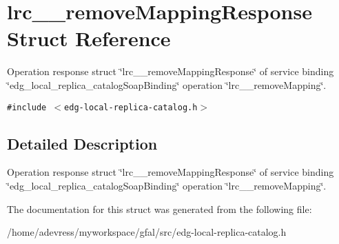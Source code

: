 \section{lrc\_\-\_\-remove\-Mapping\-Response Struct Reference}
\label{structlrc____removeMappingResponse}
Operation response struct \char`\"{}lrc\_\-\_\-remove\-Mapping\-Response\char`\"{} of service binding \char`\"{}edg\_\-local\_\-replica\_\-catalog\-Soap\-Binding\char`\"{} operation \char`\"{}lrc\_\-\_\-remove\-Mapping\char`\"{}.  


{\tt \#include $<$edg-local-replica-catalog.h$>$}



\subsection{Detailed Description}
Operation response struct \char`\"{}lrc\_\-\_\-remove\-Mapping\-Response\char`\"{} of service binding \char`\"{}edg\_\-local\_\-replica\_\-catalog\-Soap\-Binding\char`\"{} operation \char`\"{}lrc\_\-\_\-remove\-Mapping\char`\"{}. 



The documentation for this struct was generated from the following file:\begin{CompactItemize}
\item 
/home/adevress/myworkspace/gfal/src/edg-local-replica-catalog.h\end{CompactItemize}
